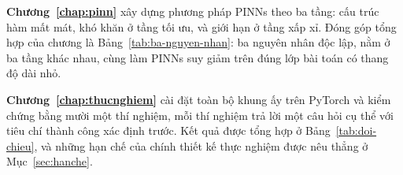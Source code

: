 \textbf{Chương~\ref{chap:pinn}} xây dựng phương pháp PINNs theo ba tầng: cấu trúc
hàm mất mát, khó khăn ở tầng tối ưu, và giới hạn ở tầng xấp xỉ. Đóng góp tổng hợp
của chương là Bảng~\ref{tab:ba-nguyen-nhan}: ba nguyên nhân độc lập, nằm ở ba tầng
khác nhau, cùng làm PINNs suy giảm trên đúng lớp bài toán có thang độ dài nhỏ.
 
\textbf{Chương~\ref{chap:thucnghiem}} cài đặt toàn bộ khung ấy trên PyTorch và
kiểm chứng bằng mười một thí nghiệm, mỗi thí nghiệm trả lời một câu hỏi cụ thể với tiêu
chí thành công xác định trước. Kết quả được tổng hợp ở Bảng~\ref{tab:doi-chieu},
và những hạn chế của chính thiết kế thực nghiệm được nêu thẳng ở
Mục~\ref{sec:hanche}.